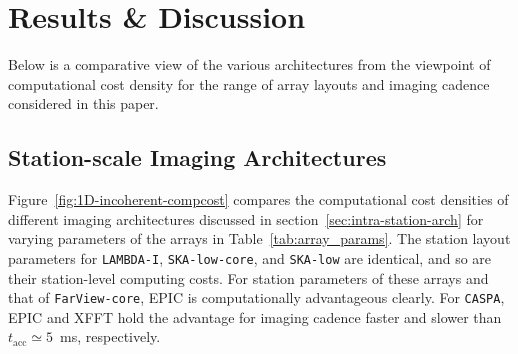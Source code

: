 \documentclass[
  journal=pasa,
  manuscript=article-type,
  year=2020,
  volume=37,
]{cup-journal}
\begin{document}




\section{Results \& Discussion} \label{sec:results}

Below is a comparative view of the various architectures from the viewpoint of computational cost density for the range of array layouts and imaging cadence considered in this paper. 

\subsection{Station-scale Imaging Architectures}\label{sec:station-scale-imaging}

Figure~\ref{fig:1D-incoherent-compcost} compares the computational cost densities of different imaging architectures discussed in section~\ref{sec:intra-station-arch} for varying parameters of the arrays in Table~\ref{tab:array_params}. The station layout parameters for \texttt{LAMBDA-I}, \texttt{SKA-low-core}, and \texttt{SKA-low} are identical, and so are their station-level computing costs. For station parameters of these arrays and that of \texttt{FarView-core}, EPIC is computationally advantageous clearly. For \texttt{CASPA}, EPIC and XFFT hold the advantage for imaging cadence faster and slower than $t_\textrm{acc}\simeq 5$~ms, respectively.
\end{document}
